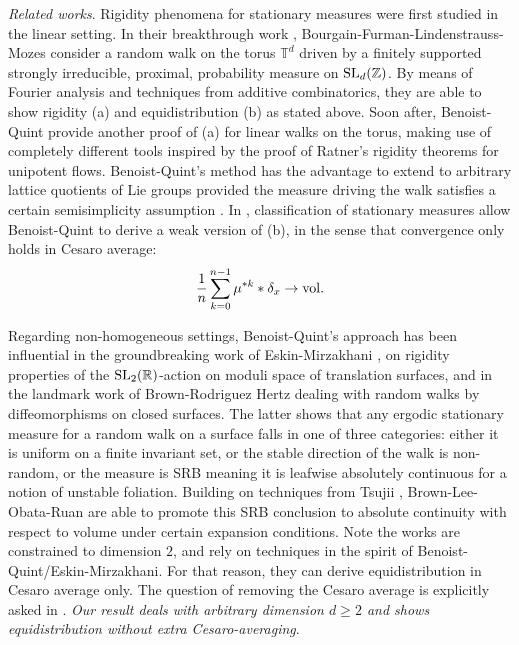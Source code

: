 \documentclass[11pt, leqno, fleqn]{amsart}
\def\SL{   {\rm SL}}
\def \R{{\mathbb R}}
\def \Z{{\mathbb Z}}
\newcommand{\T}{{\mathbb T}}
\theoremstyle{definition}
\theoremstyle{definition}
\def \vol{  {\rm vol} }
\begin{document}
\noindent\emph{Related works}. Rigidity phenomena for stationary measures were first studied in the linear setting. In their breakthrough work \cite{BFLM}, Bourgain-Furman-Lindenstrauss-Mozes consider a random walk on the torus $\T^d$ driven by a finitely supported strongly irreducible, proximal,  probability measure on $\SL_{d}(\Z)$. By means of Fourier analysis and techniques from additive combinatorics, they are able to show rigidity (a) and equidistribution (b) as stated above. Soon after, Benoist-Quint \cite{BQ1} provide another proof of (a) for linear walks on the torus,  making use of completely different tools inspired by the proof of Ratner's rigidity theorems for unipotent flows. Benoist-Quint's method has the advantage to extend to arbitrary lattice quotients of Lie groups provided the measure driving the walk satisfies a certain semisimplicity assumption \cite{BQ1, BQ2}. In \cite{BQ3}, classification of stationary measures allow Benoist-Quint to derive a weak version of (b), in the sense that convergence only holds in Cesaro average:
$$\frac{1}{n}\sum_{k=0}^{n-1}\mu^{*k}*\delta_{x}\rightarrow \vol. $$

Regarding non-homogeneous  settings, Benoist-Quint's approach has been influential in the  groundbreaking    work of Eskin-Mirzakhani \cite{EM}, on rigidity properties of the $\SL_{2}(\R)$-action on moduli space of translation surfaces, and in the  landmark work of Brown-Rodriguez Hertz \cite{BRH} dealing with random walks by diffeomorphisms on closed surfaces. The latter shows that any ergodic stationary measure  for a random walk on a surface falls in one of  three categories: either it is uniform on a finite invariant set, or the stable direction of the walk is non-random,
 or the measure is SRB meaning it is leafwise absolutely continuous for a notion of unstable foliation.   Building on  techniques from Tsujii \cite{T2},  Brown-Lee-Obata-Ruan  \cite{BLOR1, BLOR2} are able to promote this SRB conclusion to absolute continuity with respect to volume under certain expansion conditions.  
 Note the works \cite{BRH, BLOR1, BLOR2} are constrained to dimension $2$, and rely on techniques in the spirit of Benoist-Quint/Eskin-Mirzakhani.   For that reason, they can  derive equidistribution in Cesaro average only. The question of removing the Cesaro average is explicitly asked in \cite[Question 1.2]{BLOR2}.
\emph{Our result deals with arbitrary dimension $d\geq 2$ and shows equidistribution  without extra Cesaro-averaging}. 
\end{document}
